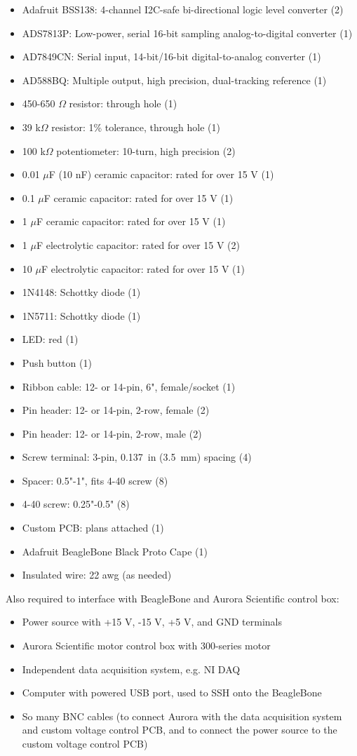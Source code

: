 \documentclass[11pt, letterpaper]{article}
\begin{document}
\begin{itemize}
	\item Adafruit BSS138: 4-channel I2C-safe bi-directional logic level converter (2)
	\item ADS7813P: Low-power, serial 16-bit sampling analog-to-digital converter (1)
	\item AD7849CN: Serial input, 14-bit/16-bit digital-to-analog converter (1)
	\item AD588BQ: Multiple output, high precision, dual-tracking reference (1)
	\item 450-650 $\Omega$ resistor: through hole (1)
	\item 39 k$\Omega$ resistor: 1\% tolerance, through hole (1)
	\item 100 k$\Omega$ potentiometer: 10-turn, high precision (2)
	\item 0.01 $\mu$F (10 nF) ceramic capacitor: rated for over 15 V (1)
	\item 0.1 $\mu$F ceramic capacitor: rated for over 15 V (1)
	\item 1 $\mu$F ceramic capacitor: rated for over 15 V (1)
	\item 1 $\mu$F electrolytic capacitor: rated for over 15 V (2)
	\item 10 $\mu$F electrolytic capacitor: rated for over 15 V (1)
	\item 1N4148: Schottky diode (1)
	\item 1N5711: Schottky diode (1)
	\item LED: red (1)
	\item Push button (1)
	\item Ribbon cable: 12- or 14-pin, 6", female/socket (1)
	\item Pin header: 12- or 14-pin, 2-row, female (2)
	\item Pin header: 12- or 14-pin, 2-row, male (2)
	\item Screw terminal: 3-pin, 0.137~in (3.5~mm) spacing (4)
	\item Spacer: 0.5"-1", fits 4-40 screw (8)
	\item 4-40 screw: 0.25"-0.5" (8)
	\item Custom PCB: plans attached (1)
	\item Adafruit BeagleBone Black Proto Cape (1)
	\item Insulated wire: 22 awg (as needed)
\end{itemize}

Also required to interface with BeagleBone and Aurora Scientific control box:
\begin{itemize}
	\item Power source with +15 V, -15 V, +5 V, and GND terminals
	\item Aurora Scientific motor control box with 300-series motor
	\item Independent data acquisition system, e.g. NI DAQ
	\item Computer with powered USB port, used to SSH onto the BeagleBone
	\item So many BNC cables (to connect Aurora with the data acquisition system and custom voltage control PCB, and to connect the power source to the custom voltage control PCB)
\end{itemize}
\end{document}
